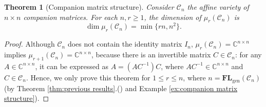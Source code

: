 \documentclass[reqno]{amsart}
\newtheorem{theorem}{Theorem}[section]
\theoremstyle{definition}
\numberwithin{equation}{section}
\begin{document}
\begin{theorem}[Companion matrix structure]\label{thm:dimension for companion structure}
    Consider $\mathcal{C}_n$ the affine variety of $n \times n$ companion matrices. For each $n,r \geq 1$, the dimension of $\mu_r(\mathcal{C}_n)$ is
    \begin{equation*}
        \dim \mu_r(\mathcal{C}_n)=\min\{rn,n^2\}.
    \end{equation*}
\end{theorem}
\begin{proof}
    Although $\mathcal{C}_n$ does not contain the identity matrix $I_n$, $\mu_r(\mathcal{C}_n)=\mathbb{C}^{n \times n}$ implies $\mu_{r+1}(\mathcal{C}_n)=\mathbb{C}^{n \times n}$, because there is an invertible matrix $C \in \mathcal{C}_n$: for any $A \in \mathbb{C}^{n \times n}$, it can be expressed as $A=(AC^{-1})C$, where $AC^{-1} \in \mathbb{C}^{n \times n}$ and $C \in \mathcal{C}_n$. Hence, we only prove this theorem for $1 \leq r \leq n$, where $n=\mathbf{FL}_{\text{gen}}(\mathcal{C}_n)$ (by Theorem \ref{thm:previous results}.() and Example \ref{ex:companion matrix structure}).
    

\end{proof}
\end{document}
